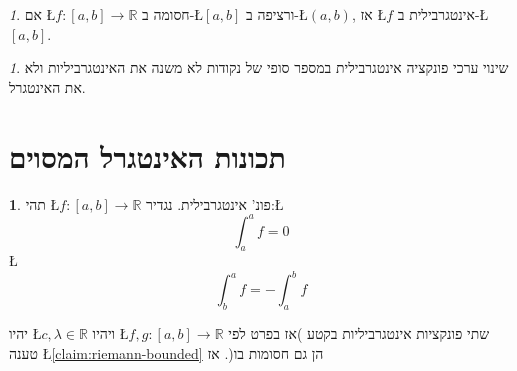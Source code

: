 \documentclass[english,hebrew]{article}
\theoremstyle{remark}
\theoremstyle{definition}
\newtheorem*{defn*}{\protect\definitionname}
\theoremstyle{plain}
\theoremstyle{remark}
\newtheorem{claim}[thm]{\protect\claimname}
\theoremstyle{plain}
\theoremstyle{plain}
\theoremstyle{definition}
\theoremstyle{plain}
\providecommand{\claimname}{טענה}
\providecommand{\definitionname}{הגדרה}
\begin{document}
\begin{claim}
אם \L{$f:\left[a,b\right]\rightarrow\mathbb{R}$} חסומה ב-\L{$\left[a,b\right]$}
ורציפה ב-\L{$\left(a,b\right)$}, אז \L{$f$} אינטגרבילית ב-\L{$\left[a,b\right]$}.
\end{claim}

\begin{claim}
\label{claim:finite-points}שינוי ערכי פונקציה אינטגרבילית במספר סופי
של נקודות לא משנה את האינטגרביליות ולא את האינטגרל.
\end{claim}

\part{תכונות האינטגרל המסוים}
\begin{defn*}
תהי \L{$f:\left[a,b\right]\rightarrow\mathbb{R}$} פונ' אינטגרבילית.
נגדיר:\L{%
\[
\int_{a}^{a}f=0
\]
}%
\L{%
\[
\int_{b}^{a}f=-\int_{a}^{b}f
\]
}%
\end{defn*}
יהיו \L{$c,\lambda\in\mathbb{R}$} ויהיו \L{$f,g:\left[a,b\right]\rightarrow\mathbb{R}$}
שתי פונקציות אינטגרביליות בקטע )אז בפרט לפי טענה \L{\ref{claim:riemann-bounded}}
הן גם חסומות בו(. אז
\end{document}
